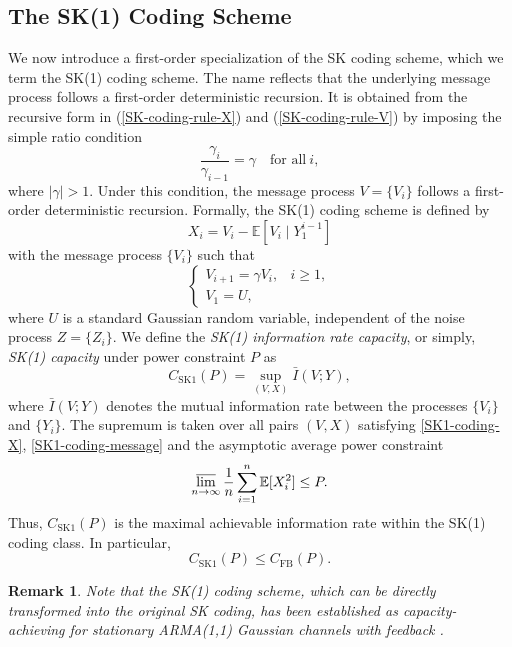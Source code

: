 \documentclass[12pt]{article}
\newtheorem{remark}[thm]{Remark}
\newcommand{\E}{\mathbb{E}}
\begin{document}
\subsection{The SK(1) Coding Scheme}\label{subsection:the_sk_1_coding_scheme}
We now introduce a first-order specialization of the SK coding scheme, which we term the SK(1) coding scheme. The name reflects that the underlying message process follows a first-order deterministic recursion. It is obtained from the recursive form in (\ref{SK-coding-rule-X}) and (\ref{SK-coding-rule-V}) by imposing the simple ratio condition
\begin{equation}\label{sk1-ratio}
\frac{\gamma_i}{\gamma_{i-1}}=\gamma\quad\mbox{for all}~i,
\end{equation}
where $|\gamma|>1$. Under this condition, the message process $V=\{V_i\}$ follows a first-order deterministic recursion. Formally, the SK(1) coding scheme is defined by
\begin{equation}\label{SK1-coding-X}
X_i = V_i - \E[V_i\mid Y_1^{i-1}]
\end{equation}
with the message process $\{V_i\}$ such that 
\begin{equation}\label{SK1-coding-message}
\begin{cases}
V_{i+1} = \gamma V_i, & i \ge 1,\\
V_1 = U,
\end{cases}
\end{equation}
where $U$ is a standard Gaussian random variable, independent of the noise process $Z=\{Z_i\}$. We define the {\em SK(1) information rate capacity}, or simply, {\em SK(1) capacity} under power constraint \(P\) as
\begin{equation}\label{feedback-capacity-SK1}
C_{\mathrm{SK1}}(P) = \sup_{(V,X)} \bar{I}(V;Y),
\end{equation}
where $\bar{I}(V;Y)$ denotes the mutual information rate between the processes $\{V_i\}$ and \(\{Y_i\}\). The supremum is taken over all pairs \((V,X)\) satisfying \eqref{SK1-coding-X}, \eqref{SK1-coding-message} and the asymptotic average power
constraint
\begin{equation}\label{power-constraint-sk1}
   \varlimsup_{n\to\infty}\frac{1}{n}\sum_{i=1}^n\E[X_i^2]\le P.
\end{equation}
Thus, \(C_{\mathrm{SK1}}(P)\) is the maximal achievable information rate within the SK(1) coding class. In particular,
$$
    C_{\mathrm{SK1}}(P)\le C_{\mathrm{FB}}(P).
$$
\begin{remark}
Note that the SK(1) coding scheme, which can be directly transformed into the original SK coding, has been established as capacity-achieving for stationary ARMA(1,1) Gaussian channels with feedback \cite{kim2009feedback}.
\end{remark}
\end{document}
